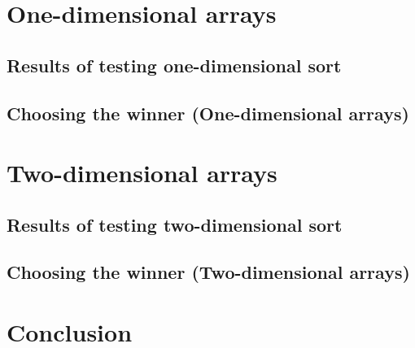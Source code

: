 \documentclass[12pt,twoside,slovak,a4paper]{article}
\begin{document}
\section{One-dimensional arrays} \label{1_dim_arr}

\subsection{Results of testing one-dimensional sort} \label{1_dim_arr:showcase}
\subsection{Choosing the winner (One-dimensional arrays)}

\section{Two-dimensional arrays} \label{2_dim_arr}

\subsection{Results of testing two-dimensional sort} \label{2_dim_arr:showcase}
\subsection{Choosing the winner (Two-dimensional arrays)}




\section{Conclusion} \label{conclusion} 





\end{document}
